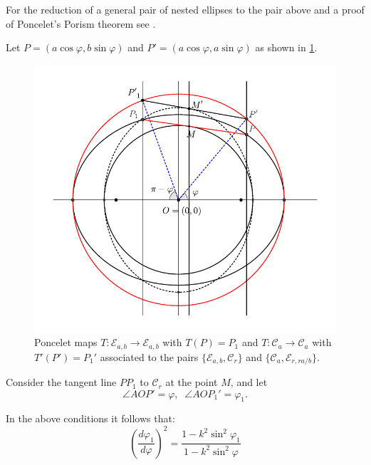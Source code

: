 For the reduction of a general pair of nested ellipses to the pair above and a proof of Poncelet's Porism theorem   see \cite{bry}.

Let $P=(a\cos\varphi, b\sin\varphi)$ and $P'=(a\cos\varphi, a\sin\varphi)$ as shown in   \cref{fig:ec}.
\begin{figure}[H]
	\begin{center}
		 \includegraphics[angle=0, width=12cm]{chap_02/pics/pics_chap2-010-poncelet-proof.pdf}
		\caption { Poncelet maps $T:\mathcal{E}_{a,b}\to\mathcal{E}_{a,b}$ with $T(P)=P_1$ and $T:\mathcal{C}_{a}\to\mathcal{C}_{a}$ with $T'(P')=P_1'$ associated to  the pairs $\{\mathcal{E}_{a,b},\mathcal{C}_r\}$ and $\{\mathcal{C}_a,\mathcal{E}_{r,ra/b}\}$. \label{fig:ec}}
	\end{center}
\end{figure}
Consider the tangent line $PP_1$ to $\mathcal{C}_r$ at the point $M$, and let
\[\angle AOP'=\varphi, \;\; \angle AOP_1'=\varphi_1.\]
\begin{proposition} In the above conditions it follows that:
    \begin{equation}
        \left(\frac{d\varphi_1}{d\varphi}\right)^2=\frac{1-k^2\sin^2\varphi_1}{1-k^2\sin^2\varphi}
            \label{eq:variacaoangular}
    \end{equation}
    \label{prop:variacaoangular}
\end{proposition}
